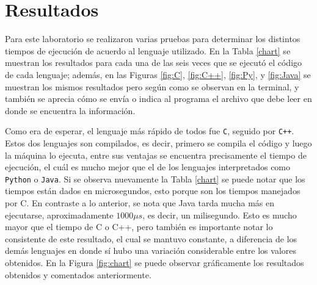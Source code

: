 \section{Resultados}

Para este laboratorio se realizaron varias pruebas para determinar los distintos tiempos de ejecución de acuerdo al lenguaje utilizado. En la Tabla \ref{chart} se muestran los resultados para cada una de las seis veces que se ejecutó el código de cada lenguaje; además, en las Figuras \ref{fig:C}, \ref{fig:C++}, \ref{fig:Py}, y \ref{fig:Java} se muestran los mismos resultados pero según como se observan en la terminal, y también se aprecia cómo se envía o indica al programa el archivo que debe leer en donde se encuentra la información. 

Como era de esperar, el lenguaje más rápido de todos fue \texttt{C}, seguido por \texttt{C++}. Estos dos lenguajes son compilados, es decir, primero se compila el código y luego la máquina lo ejecuta, entre sus ventajas se encuentra precisamente el tiempo de ejecución, el cuál es mucho mejor que el de los lenguajes interpretados como \texttt{Python} o \texttt{Java}. Si se observa nuevamente la Tabla \ref{chart} se puede notar que los tiempos están dados en microsegundos, esto porque son los tiempos manejados por C. En contraste a lo anterior, se nota que Java tarda mucha más en ejecutarse, aproximadamente $1000 \mu s$, es decir, un milisegundo. Esto es mucho mayor que el tiempo de C o C++, pero también es importante notar lo consistente de este resultado, el cual se mantuvo constante, a diferencia de los demás lenguajes en donde sí hubo una variación considerable entre los valores obtenidos. En la Figura \ref{fig:chart} se puede observar gráficamente los resultados obtenidos y comentados anteriormente.

